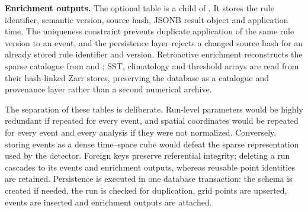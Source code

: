 \noindent\textbf{Enrichment outputs.} The optional  table is a child of . It stores the rule identifier, semantic version, source hash, JSONB result object and application time. The uniqueness constraint  prevents duplicate application of the same rule version to an event, and the persistence layer rejects a changed source hash for an already stored rule identifier and version. Retroactive enrichment reconstructs the sparse catalogue from  and ; SST, climatology and threshold arrays are read from their hash-linked Zarr stores, preserving the database as a catalogue and provenance layer rather than a second numerical archive.

The separation of these tables is deliberate. Run-level parameters would be highly redundant if repeated for every event, and spatial coordinates would be repeated for every event and every analysis if they were not normalized. Conversely, storing events as a dense time--space cube would defeat the sparse representation used by the detector. Foreign keys preserve referential integrity; deleting a run cascades to its events and enrichment outputs, whereas reusable point identities are retained. Persistence is executed in one database transaction: the schema is created if needed, the run is checked for duplication, grid points are upserted, events are inserted and enrichment outputs are attached.
